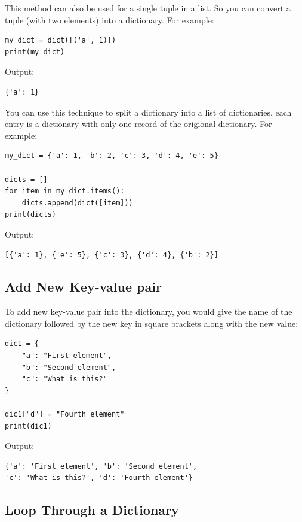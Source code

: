 \documentclass[12pt]{book}
\begin{document}
This method can also be used for a single tuple in a list. So you can convert a tuple (with two elements) into a dictionary. For example:
\begin{verbatim}
my_dict = dict([('a', 1)])
print(my_dict)
\end{verbatim}
Output:
\begin{verbatim}
{'a': 1}
\end{verbatim}
You can use this technique to split a dictionary into a list of dictionaries, each entry is a dictionary with only one record of the origional dictionary. For example:
\begin{verbatim}
my_dict = {'a': 1, 'b': 2, 'c': 3, 'd': 4, 'e': 5}

dicts = []
for item in my_dict.items():
    dicts.append(dict([item]))
print(dicts)
\end{verbatim}
Output:
\begin{verbatim}
[{'a': 1}, {'e': 5}, {'c': 3}, {'d': 4}, {'b': 2}]
\end{verbatim}

\subsection{Add New Key-value pair}
\label{sec:org16012a5}
To add new key-value pair into the dictionary, you would give the name of the dictionary followed by the new key in square brackets along with the new value:
\begin{verbatim}
dic1 = {
    "a": "First element",
    "b": "Second element",
    "c": "What is this?"
}

dic1["d"] = "Fourth element"
print(dic1)

\end{verbatim}
Output:
\begin{verbatim}
{'a': 'First element', 'b': 'Second element',
'c': 'What is this?', 'd': 'Fourth element'}
\end{verbatim}
\subsection{Loop Through a Dictionary}
\label{sec:org60d27f1}
\end{document}
